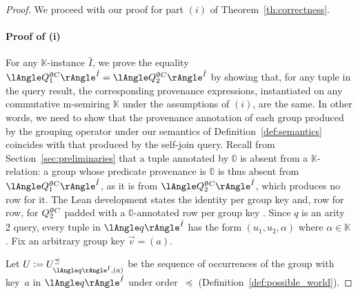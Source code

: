 \begin{proof}
We proceed with our proof for part $(i)$ of Theorem~\ref{th:correctness}.
\paragraph*{Proof of (i)}
For any $\mathbb{K}$-instance $\hat I$, we prove the equality $\angsem{\hat I}{Q^{\op C}_1}=\angsem{\hat I}{Q^{\op C}_2}$ by showing
  that, for any tuple in the query result, the corresponding provenance expressions, instantiated on any commutative m-semiring $\mathbb{K}$ under the assumptions of $(i)$, are the same.
    In other words, we need to show that the provenance annotation of each group produced by
    the grouping operator under our  semantics of
    Definition~\ref{def:semantics} coincides with
    that produced by the self-join query. Recall from
    Section~\ref{sec:preliminaries} that a tuple annotated by $\mathbb 0$
    is absent from a $\mathbb K$-relation: a group whose predicate
    provenance is $\mathbb 0$ is thus absent from $\angsem{\hat
    I}{Q^{\op C}_1}$, as it is from $\angsem{\hat I}{Q^{\op C}_2}$, which
    produces no row for it. The Lean development states the identity per
    group key  and,
    row for row, for $Q^{\mathrel{\uptheta} C}_2$ padded with a $\mathbb 0$-annotated
    row per group key
    .
    Since \(q\) is an arity~$2$ query, every tuple in $\angsem{\hat
    I}{q}$ has the form $(u_1,u_2,\alpha)$ where $\alpha\in \mathbb K$.
Fix an arbitrary group key $\vec v=(a)$.

Let $U\defeq U^{\preceq}_{\angsem{\hat I}{q},(a)}$ be the sequence of
occurrences of the group with key~$a$ in $\angsem{\hat I}{q}$ under
order~$\preceq$ (Definition~\ref{def:possible_world}).


\end{proof}
